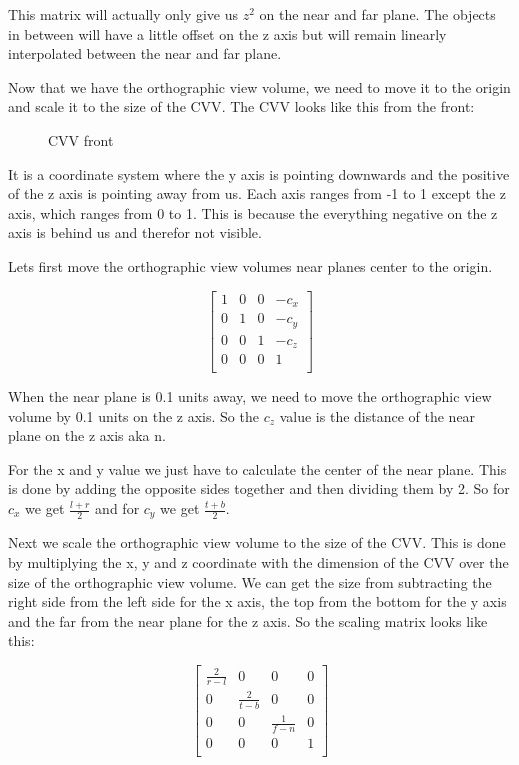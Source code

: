 \documentclass[12pt]{report} \usepackage{preamble}
\begin{document}
This matrix will actually only give us \(z^2\) on the near and far plane. The objects in between will have
a little offset on the z axis but will remain linearly interpolated between the near and far plane.

Now that we have the orthographic view volume, we need to move it to the origin and
scale it to the size of the \ac{CVV}. The \ac{CVV} looks like this from the front:

\begin{figure}[hbtp]
	\centering 
	\caption{\ac{CVV} front}
\end{figure} \floatbarrier

It is a coordinate system where the y axis is pointing downwards and the positive of the z axis
is pointing away from us. Each axis ranges from -1 to 1 except the z axis,
which ranges from 0 to 1. This is because the everything negative on the z axis
is behind us and therefor not visible.

Lets first move the orthographic view volumes near planes center to the origin.

\[
	\begin{bmatrix}
		1 & 0 & 0 & -c_x \\
		0 & 1 & 0 & -c_y \\
		0 & 0 & 1 & -c_z \\
		0 & 0 & 0 & 1    \\
	\end{bmatrix}
\]


When the near plane is 0.1 units away, we need to move the orthographic view volume
by 0.1 units on the z axis. So the \(c_z\) value is the distance of the near
plane on the z axis aka n.

For the x and y value we just have to calculate the center of the near plane.
This is done by adding the opposite sides together and then dividing them by 2.
So for \(c_x\) we get \(\frac{l + r}{2}\) and for \(c_y\) we get \(\frac{t + b}{2}\).

Next we scale the orthographic view volume to the size of the \ac{CVV}.
This is done by multiplying the x, y and z coordinate
with the dimension of the \ac{CVV} over the size of the orthographic view volume.
We can get the size from subtracting the right side from the left side for the x axis,
the top from the bottom for the y axis and the far from the near plane for the z axis.
So the scaling matrix looks like this:

\[
	\begin{bmatrix}
		\frac{2}{r - l} & 0               & 0               & 0 \\
		0               & \frac{2}{t - b} & 0               & 0 \\
		0               & 0               & \frac{1}{f - n} & 0 \\
		0               & 0               & 0               & 1 \\
	\end{bmatrix}
\]
\end{document}

